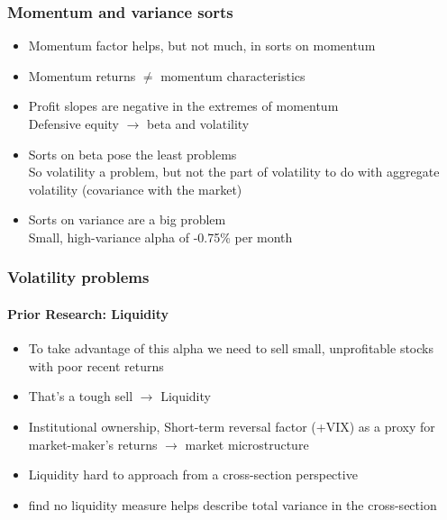 \documentclass[notes]{beamer}  %
\begin{document}
\begin{frame} \frametitle{Momentum and variance sorts}
  \begin{itemize}
    \item Momentum factor helps, but not much, in sorts on momentum
    \item Momentum returns $\neq$ momentum characteristics
    \item Profit slopes are negative in the extremes of momentum\\
    Defensive equity $\rightarrow$ beta and volatility \parencite{novy2014understanding}
    \item Sorts on beta pose the least problems\\
    So volatility a problem, but not the part of volatility to do with aggregate volatility (covariance with the market)
    \item Sorts on variance are a big problem\\
    Small, high-variance alpha of -0.75\% per month
  \end{itemize}
\end{frame}

\begin{frame} \frametitle{Volatility problems} \framesubtitle{Prior Research: Liquidity}
  \begin{itemize}
    \item To take advantage of this alpha we need to sell small, unprofitable stocks with poor recent returns
    \item That's a tough sell $\rightarrow$ Liquidity
    \parencite{nagel2005short, nagel2012evaporating}
    \item Institutional ownership, Short-term reversal factor (+VIX) as a proxy for market-maker's returns $\rightarrow$ market microstructure
    \item Liquidity hard to approach from a cross-section perspective
    \item \textcite{ang2006cross} find no liquidity measure helps describe total variance in the cross-section
  \end{itemize}
\end{frame}
\end{document}
